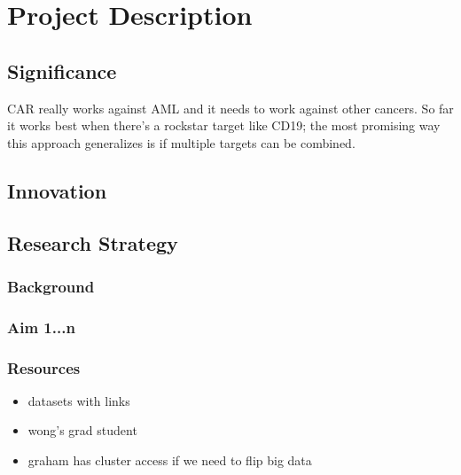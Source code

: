 \documentclass[11pt]{article}
\begin{document}
\section{Project Description}

	\subsection{Significance}
CAR really works against AML and it needs to work against other cancers.  So far it works best when there's a rockstar target like CD19; the most promising way this approach generalizes is if multiple targets can be combined.
	\subsection{Innovation}
	\subsection{Research Strategy}
		\subsubsection{Background}

		\subsubsection{Aim 1...n}

		\subsubsection{Resources}
		\begin{itemize}
			\item datasets with links 
			\item wong's grad student 
			\item graham has cluster access if we need to flip big data
			
		\end{itemize}
\end{document}
